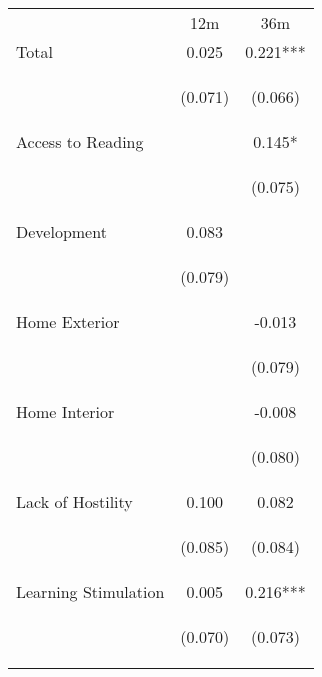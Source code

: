 \begin{tabular}{lcc}
\hline \noalign{\smallskip} & 12m & 36m\\
\noalign{\smallskip}\hline \noalign{\smallskip}Total & 0.025 & 0.221***\\
 & \begin{footnotesize}(0.071)\end{footnotesize} & \begin{footnotesize}(0.066)\end{footnotesize}\\
\noalign{\smallskip}Access to Reading &  & 0.145*\\
 & \begin{footnotesize}\end{footnotesize} & \begin{footnotesize}(0.075)\end{footnotesize}\\
\noalign{\smallskip}Development & 0.083 & \\
 & \begin{footnotesize}(0.079)\end{footnotesize} & \begin{footnotesize}\end{footnotesize}\\
\noalign{\smallskip}Home Exterior &  & -0.013\\
 & \begin{footnotesize}\end{footnotesize} & \begin{footnotesize}(0.079)\end{footnotesize}\\
\noalign{\smallskip}Home Interior &  & -0.008\\
 & \begin{footnotesize}\end{footnotesize} & \begin{footnotesize}(0.080)\end{footnotesize}\\
\noalign{\smallskip}Lack of Hostility & 0.100 & 0.082\\
 & \begin{footnotesize}(0.085)\end{footnotesize} & \begin{footnotesize}(0.084)\end{footnotesize}\\
\noalign{\smallskip}Learning Stimulation & 0.005 & 0.216***\\
 & \begin{footnotesize}(0.070)\end{footnotesize} & \begin{footnotesize}(0.073)\end{footnotesize}\\

\end{tabular}
